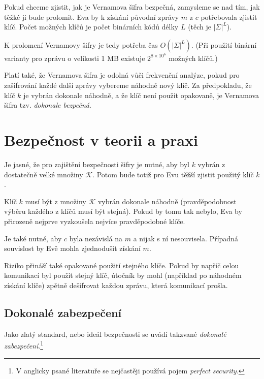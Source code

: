 \documentclass[
  program=infoi,
  biblatex,
  figures=false,
  glossaries,
  index
]{kidiplom}
\begin{document}
        Pokud chceme zjistit, jak je Vernamova šifra bezpečná, zamysleme se nad tím, jak těžké ji bude prolomit.
        Eva by k získání původní zprávy $m$ z $c$ potřebovala zjistit klíč. Počet možných klíčů je počet binárních kódů délky $L$ (těch je $|\Sigma|^L$).

        K prolomení Vernamovy šifry je tedy potřeba čas $O(|\Sigma|^L)$. (Při použití binární varianty pro zprávu o velikosti 1 MB existuje $2^{8 \times 10^6}$ možných klíčů.)
        
        Platí také, že Vernamova šifra je odolná vůči frekvenční analýze, pokud pro zašifrování každé další zprávy vybereme náhodně nový klíč.
        Za předpokladu, že klíč $k$ je vybrán dokonale náhodně, a že klíč není použit opakovaně, je Vernamova šifra tzv.
        \emph{dokonale bezpečná}.





\section{Bezpečnost v teorii a praxi}
    
    Je jasné, že pro zajištění bezpečnosti šifry je nutné, aby byl $k$ vybrán z dostatečně velké množiny $\mathcal{K}$.
    Potom bude totiž pro Evu těžší zjistit použitý klíč $k$.

    Klíč $k$ musí být z množiny $\mathcal{K}$ vybrán dokonale náhodně (pravděpodobnost výběru každého z klíčů musí být stejná).
    Pokud by tomu tak nebylo, Eva by přirozeně nejprve vyzkoušela nejvíce pravděpodobné klíče.

    Je také nutné, aby $c$ byla nezávislá na $m$ a nijak s ní nesouvisela. Případná souvislost by Evě mohla zjednodušit získání $m$.

    \begin{remark}
        Riziko přináší také opakované použití stejného klíče.
        Pokud by napříč celou komunikací byl použit stejný klíč, útočník by mohl (například po náhodném získání klíče) zpětně
        dešifrovat každou zprávu, která komunikací prošla.
    \end{remark}

    \subsection*{Dokonalé zabezpečení}
    Jako zlatý standard, nebo ideál bezpečnosti se uvádí takzvané \emph{dokonalé zabezpečení}.\footnote{V anglicky psané
    literatuře se nejčastěji používá pojem \emph{perfect security}.}
\end{document}
